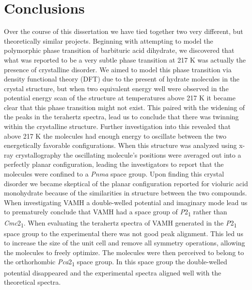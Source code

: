 \chapter{Conclusions}
\label{chap:Conclusions}

Over the course of this dissertation we have tied together two very different, but theoretically similar projects. Beginning with attempting to model the polymorphic phase transition of barbituric acid dihydrate, we discovered that what was reported to be a very subtle phase transition at 217 K was actually the presence of crystalline disorder. We aimed to model this phase transition via density functional theory (DFT) due to the present of hydrate molecules in the crystal structure, but when two equivalent energy well were observed in the potential energy scan of the structure at temperatures above 217 K it became clear that this phase transition might not exist. This paired with the widening of the peaks in the terahertz spectra, lead us to conclude that there was twinning within the crystalline structure. Further investigation into this revealed that above 217 K the molecules had enough energy to oscillate between the two energetically favorable configurations. When this structure was analyzed using x-ray crystallography the oscillating molecule's positions were averaged out into a perfectly planar configuration, leading the investigators to report that the molecules were confined to a \textit{Pnma} space group. Upon finding this crystal disorder we became skeptical of the planar configuration reported for violuric acid monohydrate because of the similarities in structure between the two compounds. When investigating VAMH a double-welled potential and imaginary mode lead us to prematurely conclude that VAMH had a space group of \textit{P}2\textsubscript{1} rather than \textit{Cmc}2\textsubscript{1}. When evaluating the terahertz spectra of VAMH generated in the \textit{P}2\textsubscript{1} space group to the experimental there was not good peak alignment. This led us to increase the size of the unit cell and remove all symmetry operations, allowing the molecules to freely optimize. The molecules were then perceived to belong to the orthorhombic \textit{Pca}2\textsubscript{1} space group. In this space group the double-welled potential disappeared and the experimental spectra aligned well with the theoretical spectra. 
